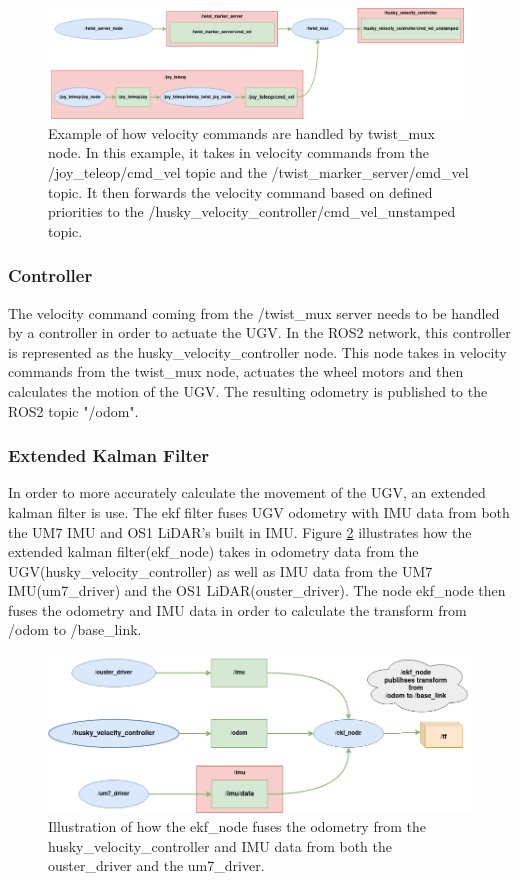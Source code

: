 \begin{figure}[H]
  \centering
  \includegraphics[width = 0.98\textwidth]{Figures/husky_teleop.drawio.png}
  \caption{Example of how velocity commands are handled by twist\_mux node. In this example, it takes in velocity commands from the /joy\_teleop/cmd\_vel topic and the /twist\_marker\_server/cmd\_vel topic. It then forwards the velocity command based on defined priorities to the /husky\_velocity\_controller/cmd\_vel\_unstamped topic.}
  \label{fig:rqt_teleop}
\end{figure}

\subsubsection{Controller}
The velocity command coming from the /twist\_mux server needs to be handled by a controller in order to actuate the UGV. In the ROS2 network, this controller is represented as the husky\_velocity\_controller node. This node takes in velocity commands from the twist\_mux node, actuates the wheel motors and then calculates the motion of the UGV. The resulting odometry is published to the ROS2 topic "/odom".

\subsubsection{Extended Kalman Filter}
In order to more accurately calculate the movement of the UGV, an extended kalman filter is use. The ekf filter fuses UGV odometry with IMU data from both the UM7 IMU and OS1 LiDAR's built in IMU. Figure \ref{fig:rqt_ekf} illustrates how the extended kalman filter(ekf\_node) takes in odometry data from the UGV(husky\_velocity\_controller) as well as IMU data from the UM7 IMU(um7\_driver) and the OS1 LiDAR(ouster\_driver). The node ekf\_node then fuses the odometry and IMU data in order to calculate the transform from /odom to /base\_link.

\begin{figure}[H]
  \centering
  \includegraphics[width = 1\textwidth]{Figures/husky_nodess.drawio.png}
  \caption{Illustration of how the ekf\_node fuses the odometry from the husky\_velocity\_controller and IMU data from both the ouster\_driver and the um7\_driver.}
  \label{fig:rqt_ekf}
\end{figure}

